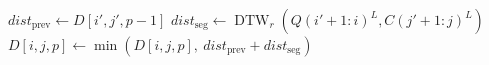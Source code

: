 \begin{algorithm}[t] %
	\caption{Line 6 in Algorithm~\ref{alg:psdtw}}
	\label{alg:psdtw-recurrence}
	\begin{algorithmic}[1]
		\State $\textit{dist}_{\text{prev}} \gets D[i', j', p-1]$
		\State $\textit{dist}_{\text{seg}} \gets \operatorname{DTW}_r(Q{(i'+1: i)}^L, C{(j'+1: j)}^L)$
		\State $D[i,j,p] \gets \min(D[i,j,p],~ \textit{dist}_{\text{prev}} + \textit{dist}_{\text{seg}})$
		\EndFor
		\EndFor
	\end{algorithmic}
\end{algorithm}